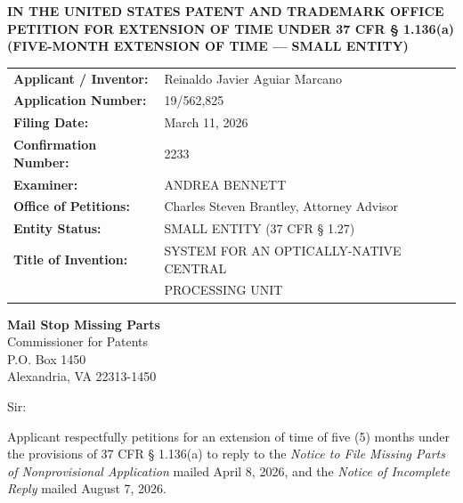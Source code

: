 \documentclass[11pt,letterpaper]{article}
\begin{document}
\thispagestyle{empty}

\begin{center}
    \textbf{\large IN THE UNITED STATES PATENT AND TRADEMARK OFFICE} \\
    \vspace{0.3cm}
    \textbf{\large PETITION FOR EXTENSION OF TIME UNDER 37 CFR \S{} 1.136(a)} \\
    \textbf{\normalsize (FIVE-MONTH EXTENSION OF TIME --- SMALL ENTITY)}
\end{center}

\vspace{0.4cm}
\noindent\begin{tabular}{p{2.3in}p{4.0in}}
\textbf{Applicant / Inventor:} & Reinaldo Javier Aguiar Marcano \\
\textbf{Application Number:} & 19/562,825 \\
\textbf{Filing Date:} & March 11, 2026 \\
\textbf{Confirmation Number:} & 2233 \\
\textbf{Examiner:} & ANDREA BENNETT \\
\textbf{Office of Petitions:} & Charles Steven Brantley, Attorney Advisor \\
\textbf{Entity Status:} & SMALL ENTITY (37 CFR \S{} 1.27) \\
\textbf{Title of Invention:} & SYSTEM FOR AN OPTICALLY-NATIVE CENTRAL \\
& PROCESSING UNIT \\
\end{tabular}

\vspace{0.5cm}
\noindent\textbf{Mail Stop Missing Parts} \\
Commissioner for Patents \\
P.O. Box 1450 \\
Alexandria, VA 22313-1450

\vspace{0.2cm}
Sir:

Applicant respectfully petitions for an extension of time of five (5) months under the provisions of 37 CFR \S{} 1.136(a) to reply to the \textit{Notice to File Missing Parts of Nonprovisional Application} mailed April 8, 2026, and the \textit{Notice of Incomplete Reply} mailed August 7, 2026.
\end{document}

